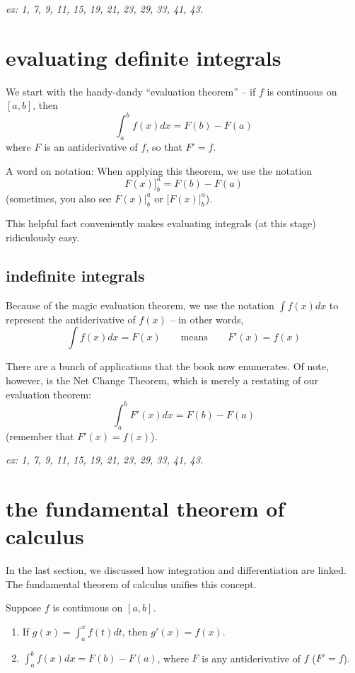 \documentclass[10pt,a4paper]{report}
\begin{document}
\emph{ex: 1,  7,  9,  11,  15,  19,  21, 23, 29, 33, 41, 43.}


\section{evaluating definite integrals}

We start with the handy-dandy ``evaluation theorem'' -- if $f$ is continuous on $[a, b]$, then
$$
	\int_a^b f(x)dx = F(b) - F(a)
$$
where $F$ is an antiderivative of $f$, so that $F' = f$.

A word on notation: When applying this theorem, we use the notation
$$
	F(x) \Big]_b^a = F(b) - F(a)
$$
(sometimes, you also see $F(x) \Big|_b^a$ or $\Big[F(x) \Big]_b^a$).

This helpful fact conveniently makes evaluating integrals (at this stage) ridiculously easy.


\subsection{indefinite integrals}

Because of the magic evaluation theorem, we use the notation $\int f(x)dx$ to represent the antiderivative of $f(x)$ -- in other words,
$$
	\int f(x) dx = F(x) \qquad \text{means} \qquad F'(x) = f(x)
$$


There are a bunch of applications that the book now enumerates. Of note, however, is the Net Change Theorem, which is merely a restating of our evaluation theorem:
$$
	\int_a^b F'(x)dx = F(b) - F(a)
$$
(remember that $F'(x) = f(x)$).

\emph{ex: 1,  7,  9,  11,  15,  19,  21,  23, 29, 33, 41, 43.}

\section{the fundamental theorem of calculus}

In the last section, we discussed how integration and differentiation are linked. The fundamental theorem of calculus unifies this concept.

Suppose $f$ is continuous on $[a, b]$.

\begin{enumerate}
	\item If $g(x) = \int_a^x f(t) dt$, then $g'(x) = f(x)$.
	\item $\int_a^b f(x)dx = F(b) - F(a)$, where $F$ is any antiderivative of $f$ ($F' = f$).
\end{enumerate}
\end{document}
